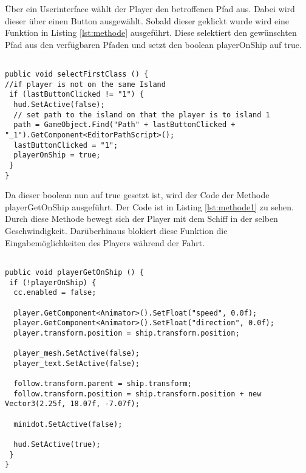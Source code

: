 Über ein Userinterface wählt der Player den betroffenen Pfad aus. Dabei wird dieser über einen Button ausgewählt. Sobald dieser geklickt wurde wird eine Funktion in Listing \ref{lst:methode} ausgeführt. Diese selektiert den gewünschten Pfad aus den verfügbaren Pfaden und setzt den boolean playerOnShip auf true. 

\begin{scriptsize}
\lstset{
	float,
	caption=Methode selectFirstClass, 
	language=[Sharp]C, 
	frame=single,  
	showstringspaces=false, 
	showspaces=false, 
	numbers=left, 
	captionpos=b, 
	belowcaptionskip=4pt,
	basicstyle=\ttfamily
} 
\begin{lstlisting}[label=lst:methode]

public void selectFirstClass () {
//if player is not on the same Island
 if (lastButtonClicked != "1") {
  hud.SetActive(false);
  // set path to the island on that the player is to island 1
  path = GameObject.Find("Path" + lastButtonClicked + "_1").GetComponent<EditorPathScript>();
  lastButtonClicked = "1";
  playerOnShip = true;
 }
}

\end{lstlisting}
\end{scriptsize}

Da dieser boolean nun auf true gesetzt ist, wird der Code der Methode playerGetOnShip ausgeführt. Der Code ist in Listing \ref{lst:methode1} zu sehen. Durch diese Methode bewegt sich der Player mit dem Schiff in der selben Geschwindigkeit. Darüberhinaus blokiert diese Funktion die Eingabemöglichkeiten des Players während der Fahrt.

\begin{scriptsize}
\lstset{
	float,
	caption=Methode playerGetOnShip, 
	language=[Sharp]C, 
	frame=single,  
	showstringspaces=false, 
	showspaces=false, 
	numbers=left, 
	captionpos=b, 
	belowcaptionskip=4pt,
	basicstyle=\ttfamily
} 
\begin{lstlisting}[label=lst:methode1]

public void playerGetOnShip () {
 if (!playerOnShip) {
  cc.enabled = false;

  player.GetComponent<Animator>().SetFloat("speed", 0.0f);
  player.GetComponent<Animator>().SetFloat("direction", 0.0f);
  player.transform.position = ship.transform.position;

  player_mesh.SetActive(false);
  player_text.SetActive(false);

  follow.transform.parent = ship.transform;
  follow.transform.position = ship.transform.position + new Vector3(2.25f, 18.07f, -7.07f);

  minidot.SetActive(false);

  hud.SetActive(true);
 }
}

\end{lstlisting}
\end{scriptsize}

